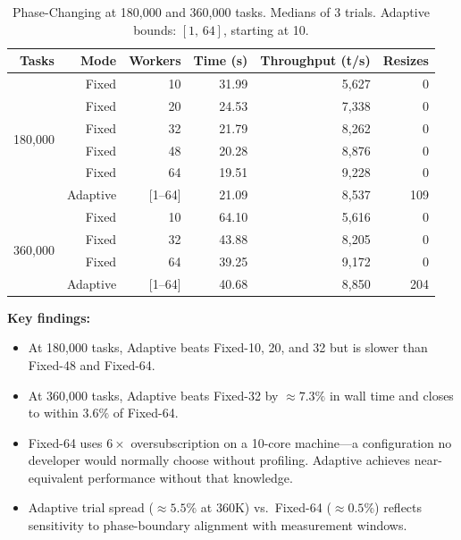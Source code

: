 \documentclass[12pt,a4paper]{article}
\begin{document}
\begin{table}[H]
\centering
\caption{Phase-Changing at 180,000 and 360,000 tasks.
         Medians of 3 trials.
         Adaptive bounds: $[1,\,64]$, starting at 10.}
\begin{tabular}{rrrrrr}
\toprule
\textbf{Tasks} & \textbf{Mode} & \textbf{Workers}
  & \textbf{Time (s)} & \textbf{Throughput (t/s)} & \textbf{Resizes} \\
\midrule
\multirow{6}{*}{180,000}
  & Fixed    & 10     & 31.99 & 5,627 &   0 \\
  & Fixed    & 20     & 24.53 & 7,338 &   0 \\
  & Fixed    & 32     & 21.79 & 8,262 &   0 \\
  & Fixed    & 48     & 20.28 & 8,876 &   0 \\
  & Fixed    & 64     & 19.51 & 9,228 &   0 \\
  & \cellcolor{rowblue}Adaptive
    & \cellcolor{rowblue}[1--64]
    & \cellcolor{rowblue}21.09
    & \cellcolor{rowblue}8,537
    & \cellcolor{rowblue}109 \\
\midrule
\multirow{4}{*}{360,000}
  & Fixed    & 10     & 64.10 & 5,616 &   0 \\
  & Fixed    & 32     & 43.88 & 8,205 &   0 \\
  & Fixed    & 64     & 39.25 & 9,172 &   0 \\
  & \cellcolor{rowblue}Adaptive
    & \cellcolor{rowblue}[1--64]
    & \cellcolor{rowblue}40.68
    & \cellcolor{rowblue}8,850
    & \cellcolor{rowblue}204 \\
\bottomrule
\end{tabular}
\label{tab:large}
\end{table}

\textbf{Key findings:}
\begin{itemize}
  \item At 180,000 tasks, Adaptive beats Fixed-10, 20, and 32 but is
        slower than Fixed-48 and Fixed-64.
  \item At 360,000 tasks, Adaptive beats Fixed-32 by $\approx 7.3\%$ in
        wall time and closes to within $3.6\%$ of Fixed-64.
  \item Fixed-64 uses $6\times$ oversubscription on a 10-core machine---a
        configuration no developer would normally choose without profiling.
        Adaptive achieves near-equivalent performance without that knowledge.
  \item Adaptive trial spread ($\approx 5.5\%$ at 360K) vs.\ Fixed-64
        ($\approx 0.5\%$) reflects sensitivity to phase-boundary alignment
        with measurement windows.
\end{itemize}
\end{document}

